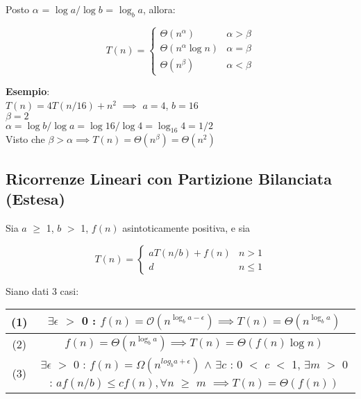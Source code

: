 \documentclass[../cheatSheetAlgoritmi.tex]{subfiles}
\begin{document}
Posto $\alpha$ = $\log{a}/\log{b}$ = $\log_{b}{a}$, allora:\\

\begin{center}
	\begin{equation*}
  		T(n)=\begin{cases}
			\Theta(n^{\alpha}) & \text{$\alpha > \beta$}\\
    		\Theta(n^{\alpha} \log{n}) & \text{$\alpha = \beta$}\\
    		\Theta(n^{\beta}) & \text{$\alpha < \beta$}
  		\end{cases}
	\end{equation*}
\end{center}

\textbf{Esempio}:\\
$T(n) = 4T(n/16) + n^{2}$ $\implies$ $a = 4$, $b = 16$\\
$\beta = 2$\\
$\alpha = \log{b} / \log{a} = \log{16} / \log{4} = \log_{16}{4} = 1/2$\\
Visto che $\beta > \alpha \implies T(n) = \Theta(n^{\beta}) = \Theta(n^{2})$ 
\newpage

\subsection{Ricorrenze Lineari con Partizione Bilanciata (Estesa)}
Sia $a$ $\geq$ 1, $b$ $>$ 1, $f(n)$ asintoticamente positiva, e sia 
\begin{center}
	\begin{equation*}
  		T(n)=\begin{cases}
    		aT(n/b) + f(n) & \text{$n > 1$}\\
    		d & \text{$n \leq 1$}
  		\end{cases}
	\end{equation*}
\end{center}

Siano dati 3 casi:

\begin{center}
	\renewcommand{\arraystretch}{1.2}
	\begin{tabular}{ |c|c| } 
		\hline
			(1) & $\exists \epsilon$ $>$ 0 : $f(n) = \mathcal{O}(n^{\log_{b}{a} - \epsilon}) \implies T(n) = \Theta(n^{\log_{b}{a}})$\\
		\hline
			(2) & $f(n) = \Theta(n^{\log_{b}{a}}) \implies T(n) = \Theta(f(n) \log{n})$\\
		\hline
			(3) & \makecell{$\exists \epsilon$ $>$ 0 : $f(n) = \Omega(n^{log_{b}{a} + \epsilon})$ $\wedge$ \\ $\exists c$ : 0 $<$ $c$ $<$ 1, $\exists m$ $>$ 0 : \\ $af(n/b) \leq cf(n), \forall n$ $\geq$ $m$} $\implies T(n) = \Theta(f(n))$ \\
		\hline
	\end{tabular}
\end{center}
\end{document}
